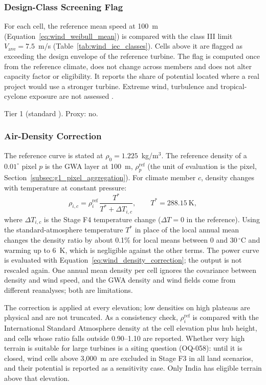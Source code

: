 \subsubsection{Design-Class Screening Flag}
\label{subsec:g1_class}

For each cell, the reference mean speed at 100~m
(Equation~\ref{eq:wind_weibull_mean}) is compared with the class III
limit $V_{\mathrm{ave}}=7.5$~m/s (Table~\ref{tab:wind_iec_classes}).
Cells above it are flagged as exceeding the design envelope of the
reference turbine. The flag is computed once from the reference climate,
does not change across members and does not alter capacity factor or
eligibility. It reports the share of potential located where a real
project would use a stronger turbine. Extreme wind, turbulence and
tropical-cyclone exposure are not assessed \cite{larsen2022}.

Tier 1 (standard \cite{iec6140012025}). Proxy: no.

\subsubsection{Air-Density Correction}

The reference curve is stated at $\rho_0=1.225$~kg/m$^3$. The reference
density of a $0.01^\circ$ pixel $p$ is the GWA layer at 100~m, $\rho^{\mathrm{ref}}_p$ (the unit of
evaluation is the pixel, Section~\ref{subsec:g1_pixel_aggregation}).
For climate member $c$, density changes with temperature at constant
pressure:
\begin{equation}
    \rho_{i,c} = \rho^{\mathrm{ref}}_i\,
      \frac{T^{*}}{T^{*}+\Delta T_{i,c}},
    \qquad T^{*}=288.15~\mathrm{K},
    \label{eq:g1_density_member}
\end{equation}
where $\Delta T_{i,c}$ is the Stage F4 temperature change ($\Delta T=0$
in the reference). Using the standard-atmosphere temperature $T^{*}$ in
place of the local annual mean changes the density ratio by about 0.1\%
for local means between 0 and 30\,$^\circ$C and warming up to 6~K, which
is negligible against the other terms. The power curve is evaluated with
Equation~\ref{eq:wind_density_correction}; the output is not rescaled
again. One annual mean density per cell ignores the covariance between
density and wind speed, and the GWA density and wind fields come from
different reanalyses; both are limitations.

The correction is applied at every elevation; low densities on high
plateaus are physical and are not truncated. As a consistency check,
$\rho^{\mathrm{ref}}_i$ is compared with the International Standard
Atmosphere density at the cell elevation plus hub height, and cells
whose ratio falls outside 0.90--1.10 are reported. Whether very high
terrain is suitable for large turbines is a siting question (OQ-058):
until it is closed, wind cells above 3,000~m are excluded in Stage F3 in
all land scenarios, and their potential is reported as a sensitivity
case. Only India has eligible terrain above that elevation.


